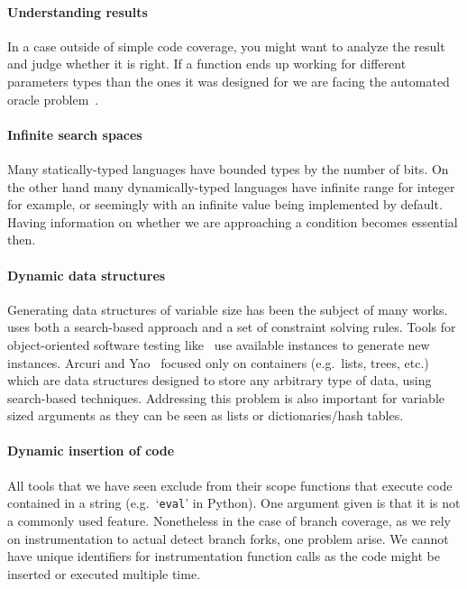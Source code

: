 \documentclass{llncs2e/llncs}
\begin{document}
\paragraph{Understanding results} In a case outside of simple code coverage, you
might want to analyze the result and judge whether it is right. If a function
ends up working for different parameters types than the ones it was designed for
we are facing the automated oracle problem~\cite{barr2015oracle}.

\paragraph{Infinite search spaces} Many statically-typed languages have bounded
types by the number of bits. On the other hand many dynamically-typed languages
have infinite range for integer for example, or seemingly with an infinite value
being implemented by default. Having information on whether we are approaching a
condition becomes essential then.

\paragraph{Dynamic data structures} Generating data structures of variable size
has been the subject of many works.~\cite{lakhotia2008handling} uses both a
search-based approach and a set of constraint solving rules. Tools for
object-oriented software testing
like~\cite{tonella2004evolutionary,ciupa2008artoo} use available instances to
generate new instances. Arcuri and Yao~\cite{arcuri2008search} focused only on
containers (e.g.\ lists, trees, etc.) which are data structures designed to
store any arbitrary type of data, using search-based techniques. Addressing this
problem is also important for variable sized arguments as they can be seen as
lists or dictionaries/hash tables.

\paragraph{Dynamic insertion of code} All tools that we have seen exclude from
their scope functions that execute code contained in a string (e.g.\
`\texttt{eval}' in Python). One argument given is that it is not a commonly used
feature.  Nonetheless in the case of branch coverage, as we rely on
instrumentation to actual detect branch forks, one problem arise. We cannot have
unique identifiers for instrumentation function calls as the code might be
inserted or executed multiple time.
\end{document}

